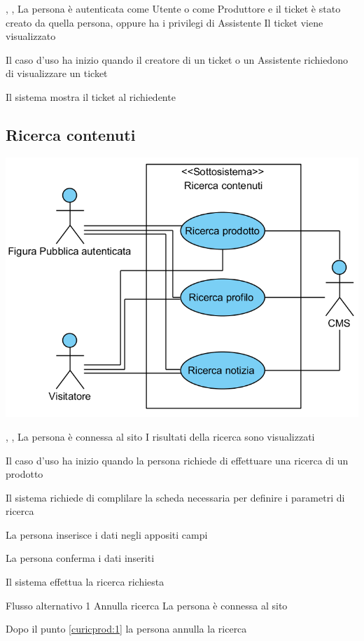 \tabcuvspace

{, , }
{La persona è autenticata come Utente o come Produttore e il ticket è stato creato da quella persona, oppure ha i privilegi di Assistente}
{Il ticket viene visualizzato}
{\begin{enumCU}
	\item Il caso d'uso ha inizio quando il creatore di un ticket o un Assistente richiedono di visualizzare un ticket
	\item Il sistema mostra il ticket al richiedente
\end{enumCU}}


\subsection{Ricerca contenuti}
\begin{center}
   \includegraphics[width=\textwidth]{assets/visualParadigm/RicercaContenuti}
\end{center}
{, , }
{La persona è connessa al sito}
{I risultati della ricerca sono visualizzati}
{\begin{enumCU}
	\item Il caso d'uso ha inizio quando la persona richiede di effettuare una ricerca di un prodotto
	\item Il sistema richiede di complilare la scheda necessaria per definire i parametri di ricerca
	\item La persona inserisce i dati negli appositi campi \label{curicprod:1}
	\item La persona conferma i dati inseriti
	\item Il sistema effettua la ricerca richiesta
\end{enumCU}}
%
{Flusso alternativo 1}%
{Annulla ricerca}%
{La persona è connessa al sito}%
{\postNulle}%
{\begin{enumCU}
		\item Dopo il punto \ref{curicprod:1} la persona annulla la ricerca
	\end{enumCU}}%

